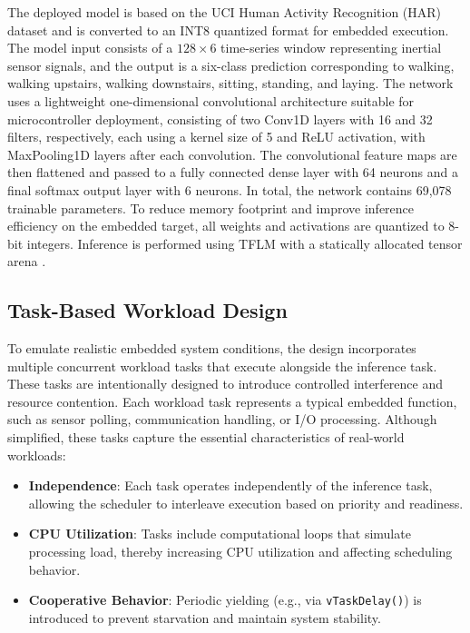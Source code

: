 \documentclass[conference]{IEEEtran}
\begin{document}
The deployed model is based on the UCI Human Activity Recognition (HAR) dataset \cite{uci_har_web} and is converted to an INT8 quantized format for embedded execution. The model input consists of a $128 \times 6$ time-series window representing inertial sensor signals, and the output is a six-class prediction corresponding to walking, walking upstairs, walking downstairs, sitting, standing, and laying. The network uses a lightweight one-dimensional convolutional architecture suitable for microcontroller deployment, consisting of two Conv1D layers with 16 and 32 filters, respectively, each using a kernel size of 5 and ReLU activation, with MaxPooling1D layers after each convolution. The convolutional feature maps are then flattened and passed to a fully connected dense layer with 64 neurons and a final softmax output layer with 6 neurons. In total, the network contains 69,078 trainable parameters. To reduce memory footprint and improve inference efficiency on the embedded target, all weights and activations are quantized to 8-bit integers. Inference is performed using TFLM with a statically allocated tensor arena \cite{warden2020tinyml,david2021tflm}.
\subsection{Task-Based Workload Design}
To emulate realistic embedded system conditions, the design incorporates multiple concurrent workload tasks that execute alongside the inference task. These tasks are intentionally designed to introduce controlled interference and resource contention. 
Each workload task represents a typical embedded function, such as sensor polling, communication handling, or I/O processing. Although simplified, these tasks capture the essential characteristics of real-world workloads:

\begin{itemize}
    \item \textbf{Independence}: Each task operates independently of the inference task, allowing the scheduler to interleave execution based on priority and readiness.
    
    \item \textbf{CPU Utilization}: Tasks include computational loops that simulate processing load, thereby increasing CPU utilization and affecting scheduling behavior.
    
    \item \textbf{Cooperative Behavior}: Periodic yielding (e.g., via \texttt{vTaskDelay()}) is introduced to prevent starvation and maintain system stability.
\end{itemize}
\end{document}
